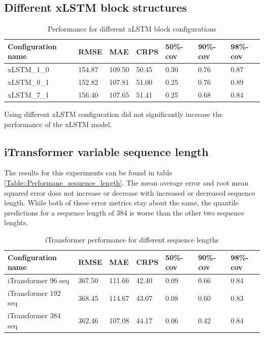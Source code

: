\documentclass[class=scrbook, crop=false]{standalone}
\begin{document}
\subsection{Different xLSTM block structures}

  \begin{table}[]
\centering
\begin{tabular}{l|l|l|l|l|l|l}
Configuration name &  RMSE & MAE & CRPS & 50\%-cov & 90\%-cov & 98\%-cov \\\hline
xLSTM\_1\_0 & 154.87 & 109.50& 50.45& 0.30 & 0.76 & 0.87 \\
xLSTM\_0\_1& 152.82 & 107.81 & 51.00 & 0.25 & 0.76 & 0.89 \\
xLSTM\_7\_1 & 156.40 & 107.65 & 51.41 & 0.25 & 0.68 & 0.84 \\
\end{tabular}
\caption{Performance for different xLSTM block configurations}
\label{Table::Performance_xLSTM}
\end{table}

Using different xLSTM configuration did not significantly increase the performance of the xLSTM model.

\subsection{iTransformer variable sequence length}

The results for this experiments can be found in table \ref{Table::Performane_sequence_length}.
The mean average error and root mean squared error does not increase or decrease with increased or decreased sequence length.
While both of these error metrics stay about the same, the quantile predictions for a sequence length of 384 is worse than the other two sequence lenghts.
 \begin{table}[]
\centering
\begin{tabular}{l|l|l|l|l|l|l}
 Configuration name &  RMSE & MAE & CRPS & 50\%-cov & 90\%-cov & 98\%-cov \\\hline
 iTransformer 96 seq & 367.50 & 111.66 & 42.40&0.09 & 0.66 & 0.84 \\
 iTransformer 192 seq & 368.45 &114.67& 43.07& 0.08 & 0.60	 & 0.83 \\
 iTransformer 384 seq & 362.46 & 107.08& 44.17	& 0.06	 &0.42	 & 0.84\\
\end{tabular}
\caption{iTransformer performance for different sequence lengths}
\label{Table::Performance_sequence_length}
\end{table}
\end{document}
